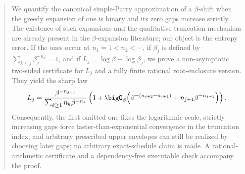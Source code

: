 \begin{abstract}
We quantify the canonical simple-Parry approximation of a $\beta$-shift when the greedy expansion of one is binary and its zero gaps increase strictly.  The existence of such expansions and the qualitative truncation mechanism are already present in the $\beta$-expansion literature; our object is the entropy error.  If the ones occur at $n_1=1<n_2<\cdots$, if $\beta_j$ is defined by $\sum_{k\leq j}\beta_j^{-n_k}=1$, and if $L_j=\log\beta-\log\beta_j$, we prove a non-asymptotic two-sided certificate for $L_j$ and a fully finite rational root-enclosure version.  They yield the sharp law
\[
 L_j=\frac{\beta^{-n_{j+1}}}{\sum_{k\geq1}n_k\beta^{-n_k}}
 \left(1+\bigO_\beta\!\left(\beta^{-(n_{j+2}-n_{j+1})}
 +n_{j+1}\beta^{-n_{j+1}}\right)\right).
\]
Consequently, the first omitted one fixes the logarithmic scale, strictly increasing gaps force faster-than-exponential convergence in the truncation index, and arbitrary prescribed upper envelopes can still be realized by choosing later gaps; no arbitrary exact-schedule claim is made.  A rational-arithmetic certificate and a dependency-free executable check accompany the proof.
\end{abstract}
